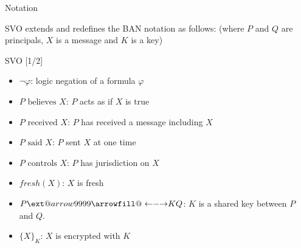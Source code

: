 \documentclass[10pt]{beamer}
\makeatletter
\newcommand\xleftrightarrow[2][]{%
  \ext@arrow 9999{\longleftrightarrowfill@}{#1}{#2}}
\newcommand\longleftrightarrowfill@{%
  \arrowfill@\leftarrow\relbar\rightarrow}
\newcommand{\xtext}[1]{\text{ #1 }}
\makeatother
\begin{document}
\begin{frame}{Notation}

	SVO \alert{extends and redefines} the BAN notation as follows: (where $P$ and $Q$ are principals, $X$ is a message and $K$ is a key)
	
	\begin{block}{SVO [1/2]}

	\begin{itemize}
		\item $\lnot \varphi$: logic negation of a formula $\varphi$
		\item $P \xtext{believes} X$: $P$ acts as if $X$ is true
		\item $P \xtext{received} X$: $P$ has received a message including $X$
		\item $P \xtext{said} X$: $P$ sent $X$ at one time
		\item $P \xtext{controls} X$: $P$ has jurisdiction on $X$
		\item $fresh(X)$: $X$ is fresh
		\item $P\xleftrightarrow{K} Q$: $K$ is a shared key between $P$ and $Q$.
		\item $\{X\}_K$: $X$ is encrypted with $K$
	\end{itemize}
\end{block}
\end{frame}
\end{document}
